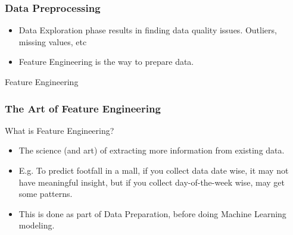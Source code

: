 

\begin{frame}[fragile]\frametitle{Data Preprocessing}	
\begin{itemize}
\item Data Exploration phase results in finding data quality issues. Outliers, missing values, etc
\item Feature Engineering is the way to prepare data.

\end{itemize}
\end{frame}


\begin{frame}
  \begin{center}
    {\Large Feature Engineering}
  \end{center}
\end{frame}



\begin{frame}[fragile]\frametitle{The Art of Feature Engineering}
What is Feature Engineering? 
	\begin{itemize}
	\item The science (and art) of extracting more information from existing data. 
\item E.g. To predict footfall in a mall, if you collect data date wise, it may not have meaningful insight, but if you collect day-of-the-week wise, may get some patterns.
\item This is done as part of Data Preparation, before doing Machine Learning modeling.
	\end{itemize}
\end{frame}

